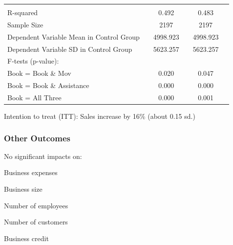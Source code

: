 \documentclass[hideothersubsections, usenames,dvipsnames,11pt]{beamer}
\newenvironment{itemize_2pt}{\itemize\addtolength{\itemsep}{2pt}}{\enditemize}
\begin{document}
\begin{frame}
{{\begin{table}[t]
\begin{tabular}{l*{5}{c}}
   	\\
\hline         							
\\
R-squared											  	&& 0.492  	&&  0.483	\\
Sample Size 											&& 2197	&& 2197 	\\
Dependent Variable Mean in Control Group			 	&&         4998.923   &&	          4998.923 	\\
Dependent Variable SD in Control Group				 	&&         5623.257   	&&           5623.257	\\
F-tests (p-value):											&&			&&			\\
\hspace{5mm}Book = Book \& Mov				        	&&            0.020 	&&           0.047 	\\
\hspace{5mm}Book = Book \& Assistance				  			&&0.000   	&& 0.000 	\\
\hspace{5mm}Book = All Three			   			  	&&0.000   	&&0.001  	\\
\hline
	\end{tabular}

\end{table}}}

\vspace{-0.5em}

\begin{itemize_2pt}
\item Intention to treat (ITT): Sales increase by 16\% (about 0.15 sd.)
\end{itemize_2pt}
\end{frame}


\begin{frame}
\frametitle{Other Outcomes}

\textcolor{bdf}{No significant impacts} on:
    \begin{itemize_2pt}
    \vspace{0.1in}
    \item Business expenses
    \vspace{0.1in} 		
    \item Business size
      \vspace{0.1in}
    \item Number of employees
      \vspace{0.1in}
    \item Number of customers
       \vspace{0.1in}
     \item Business credit
    \end{itemize_2pt}

\end{frame}
\end{document}

